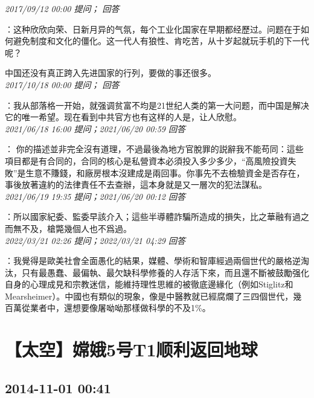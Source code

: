 \documentclass[twocolumn]{ctexart}
\begin{document}
\textit{\hfill\noindent\small 2017/09/12 00:00 提问； 回答}

：这种欣欣向荣、日新月异的气氛，每个工业化国家在早期都经歷过。问题在于如何避免制度和文化的僵化。这一代人有狼性、肯吃苦，从十岁起就玩手机的下一代呢？

中国还没有真正跨入先进国家的行列，要做的事还很多。\\

\textit{\hfill\noindent\small 2017/10/18 00:00 提问； 回答}

：我从部落格一开始，就强调贫富不均是21世纪人类的第一大问题，而中国是解决它的唯一希望。现在看到中共官方也有这样的人是，让人欣慰。\\

\textit{\hfill\noindent\small 2021/06/18 16:00 提问；2021/06/20 00:59 回答}

：
你的描述並非完全沒有道理，不過最後為地方官脫罪的説辭我不能苟同：這些項目都是有合同的，合同的核心是私營資本必須投入多少多少，“高風險投資失敗”是生意不賺錢，和廠房根本沒建成是兩回事。你事先不去檢驗資金是否存在，事後放著違約的法律責任不去查辦，這本身就是又一層次的犯法謀私。
\\

\textit{\hfill\noindent\small 2021/06/19 19:35 提问；2021/06/20 00:12 回答}

：所以國家紀委、監委早該介入；這些半導體詐騙所造成的損失，比之華融有過之而無不及，槍斃幾個人也不爲過。
\\

\textit{\hfill\noindent\small 2022/03/21 02:26 提问；2022/03/21 04:29 回答}

：我覺得是歐美社會全面愚化的結果，媒體、學術和智庫經過兩個世代的嚴格逆淘汰，只有最愚蠢、最偏執、最欠缺科學修養的人存活下來，而且還不斷被鼓勵强化自身的心理成見和宗教迷信，能維持理性思維的被徹底邊緣化（例如Stiglitz和Mearsheimer）。中國也有類似的現象，像是中醫教就已經腐爛了三四個世代，幾百萬從業者中，還想要像屠呦呦那樣做科學的不及1\%。
\\


\section{【太空】嫦娥5号T1顺利返回地球}
\subsection{2014-11-01 00:41}
\end{document}
